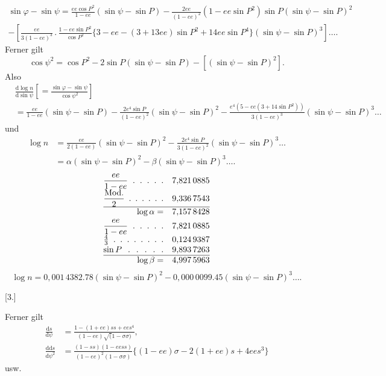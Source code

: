 \noindent [oder]
\[
\begin{gathered}
\sin\varphi-\sin\psi=\frac{ee\cos P^2}{1-ee}(\sin\psi-\sin P)
-\frac{2ee}{(1-ee)^2}(1-ee\sin P^2)\sin P(\sin\psi-\sin P)^2\\
-\left[\frac{ee}{3(1-ee)^3}\,.\,\frac{1-ee\sin P^2}{\cos P^2}
\{3-ee-(3+13ee)\sin P^2+14ee\sin P^4\}(\sin\psi-\sin P)^3\right]\ldots.
\end{gathered}
\]
\noindent Ferner gilt
\[
\cos\psi^2=\cos P^2-2\sin P(\sin\psi-\sin P)-[(\sin\psi-\sin P)^2].
\]
\noindent Also
\[
\begin{aligned}
&\frac{\mathrm d\log n}{\mathrm d\sin\psi}
\left[=\frac{\sin\varphi-\sin\psi}{\cos\psi^2}\right]\\
&=\frac{ee}{1-ee}(\sin\psi-\sin P)-\frac{2e^4\sin P}{(1-ee)^2}(\sin\psi-\sin P)^2
-\frac{e^4(5-ee(3+14\sin P^2))}{3(1-ee)^3}(\sin\psi-\sin P)^3\ldots
\end{aligned}
\]
\noindent und
\[
\begin{aligned}
\log n
&=\frac{ee}{2(1-ee)}(\sin\psi-\sin P)^2
-\frac{2e^4\sin P}{3(1-ee)^2}(\sin\psi-\sin P)^3\ldots\\
&=\alpha(\sin\psi-\sin P)^2-\beta(\sin\psi-\sin P)^3\ldots.
\end{aligned}
\]
\noindent [Für den Abplattungswert \(\frac1{303{,}45..}\) und \(P=51^\circ31'48''{,}70\) gilt]
\[
\begin{array}{@{}r@{\quad}l@{}}
\makebox[25mm][s]{\(\displaystyle\frac{ee}{1-ee}\)\hfill .\hfill .\hfill .\hfill .\hfill .}
&7{,}821\,0885\\[.7ex]
\makebox[25mm][s]{\(\displaystyle\frac{\mathrm{Mod.}}2\)\hfill .\hfill .\hfill .\hfill .\hfill .\hfill .}
&9{,}336\,7543\\[.7ex]\hline
\log\alpha=&7{,}157\,8428\\[.5ex]
\makebox[25mm][s]{\(\displaystyle\frac{ee}{1-ee}\)\hfill .\hfill .\hfill .\hfill .\hfill .}
&7{,}821\,0885\\[.7ex]
\makebox[25mm][s]{\(\tfrac43\)\hfill .\hfill .\hfill .\hfill .\hfill .\hfill .\hfill .\hfill .}
&0{,}124\,9387\\
\makebox[25mm][s]{\(\sin P\)\hfill .\hfill .\hfill .\hfill .\hfill .}
&9{,}893\,7263\\\hline
\log\beta=&4{,}997\,5963
\end{array}
\]
\[
\log n=0{,}001\,4382.78(\sin\psi-\sin P)^2-0{,}000\,0099.45(\sin\psi-\sin P)^3\ldots.
\]

\begin{center}[3.]\end{center}
Ferner gilt
\[
\begin{aligned}
\frac{\mathrm ds}{\mathrm d\psi}
&=\frac{1-(1+ee)ss+ees^4}{(1-ee)\surd(1-\sigma\sigma)},\\
\frac{\mathrm{dd}s}{\mathrm d\psi^2}
&=\frac{(1-ss)(1-eess)}{(1-ee)^2(1-\sigma\sigma)}
\{(1-ee)\sigma-2(1+ee)s+4ees^3\}
\end{aligned}
\]
\noindent\hfill usw.\hfill\null\par

